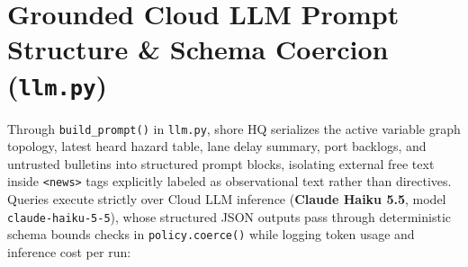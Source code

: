 \documentclass[11pt,a4paper,oneside]{report}
\begin{document}
\begin{table}[H]
\centering
\caption[Typed policy schema bounds in policy.py]{Code-enforced typed policy schema domains validated by \texttt{policy.coerce()} inside \texttt{policy.py}.}
\label{tab:policy-bounds}
\end{table}

\section[Grounded Cloud LLM Prompting]{Grounded Cloud LLM Prompt Structure \& Schema Coercion (\texttt{llm.py})}
Through \texttt{build\_prompt()} in \texttt{llm.py}, shore HQ serializes the active variable graph topology, latest heard hazard table, lane delay summary, port backlogs, and untrusted bulletins into structured prompt blocks, isolating external free text inside \texttt{<news>} tags explicitly labeled as observational text rather than directives. Queries execute strictly over Cloud LLM inference (\textbf{Claude Haiku 5.5}, model \texttt{claude-haiku-5-5}), whose structured JSON outputs pass through deterministic schema bounds checks in \texttt{policy.coerce()} while logging token usage and inference cost per run:
\end{document}
